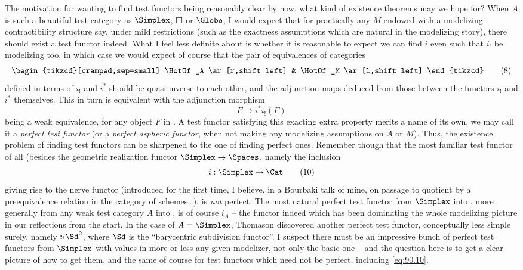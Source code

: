 The motivation for wanting to find test functors being reasonably
clear by now, what kind of existence theorems may we hope for? When
$A$ is such a beautiful test category as $\Simplex$, $\Square$ or
$\Globe$, I would expect that for practically any $M$ endowed with a
modelizing contractibility structure say, under mild restrictions
(such as the exactness assumptions which are natural in the modelizing
story), there should exist a test functor indeed. What I feel less
definite about is whether it is reasonable to expect we can find $i$
even such that $i_!$ be modelizing too, in which case we would expect
of course that the pair of equivalences of categories
\begin{equation}
  \label{eq:90.8}
  \begin{tikzcd}[cramped,sep=small]
    \HotOf_A \ar[r,shift left] & \HotOf_M \ar[l,shift left]
  \end{tikzcd}\tag{8}
\end{equation}
defined in terms of $i_!$ and $i^*$ should be quasi-inverse to each
other, and the adjunction maps deduced from those between the functors
$i_!$ and $i^*$ themselves. This in turn is equivalent with the
adjunction morphism
\begin{equation}
  \label{eq:90.9}
  F\to i^*i_!(F)\tag{9}
\end{equation}
being a weak equivalence, for any object $F$ in \Ahat. A test functor
satisfying this exacting extra property merits a name of its own, we
may call it a \emph{perfect test functor} (or a \emph{perfect aspheric
  functor}, when not making any modelizing assumptions on $A$ or
$M$). Thus, the existence problem of finding test functors can be
sharpened to the one of finding perfect ones. Remember though that the
most familiar test functor of all (besides the geometric realization
functor $\Simplex\to\Spaces$, namely the inclusion
\begin{equation}
  \label{eq:90.10}
  i:\Simplex\to\Cat\tag{10}
\end{equation}
giving rise to the nerve functor (introduced for the first time, I
believe, in a Bourbaki talk of mine, on passage to quotient by a
preequivalence relation in the category of schemes\ldots), is
\emph{not} perfect. The most natural perfect test functor from
$\Simplex$ into \Cat, more generally from any weak test category $A$
into \Cat, is of course $i_A$ -- the functor indeed which has been
dominating the whole modelizing picture in our reflections from the
start. In the case of $A=\Simplex$, Thomason discovered another
perfect test functor, conceptually less simple surely, namely
$i_!\Sd^2$, where $\Sd$ is the ``barycentric subdivision functor''.
I suspect there must be an impressive bunch of perfect test functors
from $\Simplex$ with values in more or less any given modelizer, not
only the basic one -- and the question here is to get a clear picture
of how to get them, and the same of course for test
functors which need not be perfect, including \eqref{eq:90.10}.

